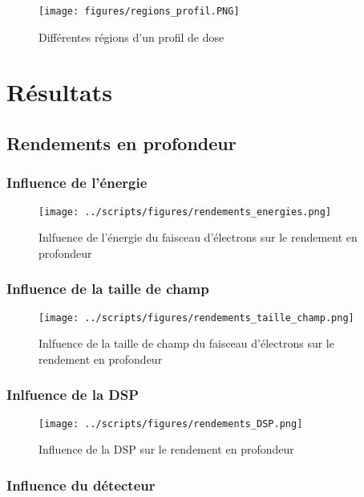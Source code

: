 \documentclass{article}
\begin{document}
\begin{figure}[h]
  \centering
  \texttt{[image: figures/regions\_profil.PNG]}
  \caption{Différentes régions d'un profil de dose}
  \label{fig_regions_profil}
\end{figure}

\newpage
\section{Résultats}
\subsection{Rendements en profondeur}

\subsubsection{Influence de l'énergie}

\begin{figure}[h]
  \centering
  \texttt{[image: ../scripts/figures/rendements\_energies.png]}
  \caption{Inlfuence de l'énergie du faisceau d'électrons sur le rendement en profondeur}
  \label{fig_rdt_energie}
\end{figure}

\subsubsection{Influence de la taille de champ}

\begin{figure}[h]
  \centering
  \texttt{[image: ../scripts/figures/rendements\_taille\_champ.png]}
  \caption{Inlfuence de la taille de champ du faisceau d'électrons sur le rendement en profondeur}
  \label{fig_rdt_champ}
\end{figure}

\subsubsection{Inlfuence de la DSP}

\begin{figure}[h!]
  \centering
  \texttt{[image: ../scripts/figures/rendements\_DSP.png]}
  \caption{Influence de la DSP sur le rendement en profondeur}
  \label{fig_rdt_DSP}
\end{figure}

\subsubsection{Influence du détecteur}
\end{document}
